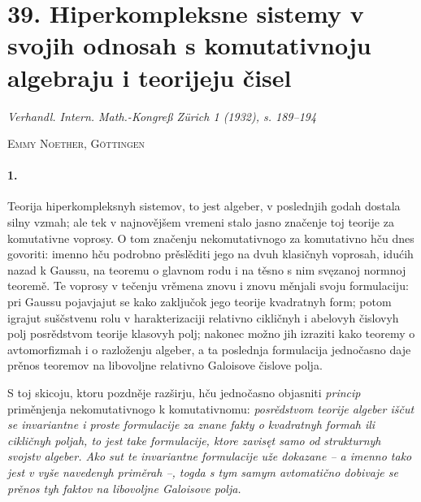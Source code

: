 \documentclass[11pt]{article}
\newcommand{\foreign}[1]{#1}
\begin{document}
\section*{39. Hiperkompleksne sistemy v svojih odnosah s komutativnoju algebraju i teorijeju čisel}

\begin{center}
\foreign{\emph{Verhandl. Intern. Math.-Kongreß Zürich 1 (1932), s. 189--194}}
\end{center}

\begin{center}
\textsc{Emmy Noether, Göttingen}
\end{center}

\paragraph{1.}
Teorija hiperkompleksnyh sistemov, to jest algeber, v poslednjih godah dostala silny vzmah; ale tek v najnovějšem vremeni stalo jasno značenje toj teorije za komutativne voprosy. O tom značenju nekomutativnogo za komutativno hču dnes govoriti: imenno hču podrobno prěslěditi jego na dvuh klasičnyh voprosah, idućih nazad k Gaussu, na teoremu o glavnom rodu i na těsno s nim svęzanoj normnoj teoremě. Te voprosy v tečenju vrěmena znovu i znovu měnjali svoju formulaciju: pri Gaussu pojavjajut se kako zaključok jego teorije kvadratnyh form; potom igrajut suščstvenu rolu v harakterizaciji relativno cikličnyh i abelovyh čislovyh polj posrědstvom teorije klasovyh polj; nakonec možno jih izraziti kako teoremy o avtomorfizmah i o razloženju algeber, a ta poslednja formulacija jednočasno daje prěnos teoremov na libovoljne relativno Galoisove čislove polja.

S toj skicoju, ktoru pozdněje razširju, hču jednočasno objasniti \emph{princip} priměnjenja nekomutativnogo k komutativnomu: \emph{posrědstvom teorije algeber iščut se invariantne i proste formulacije za znane fakty o kvadratnyh formah ili cikličnyh poljah, to jest take formulacije, ktore zavisęt samo od strukturnyh svojstv algeber. Ako sut te invariantne formulacije uže dokazane -- a imenno tako jest v vyše navedenyh priměrah --, togda s tym samym avtomatično dobivaje se prěnos tyh faktov na libovoljne Galoisove polja.}
\end{document}
